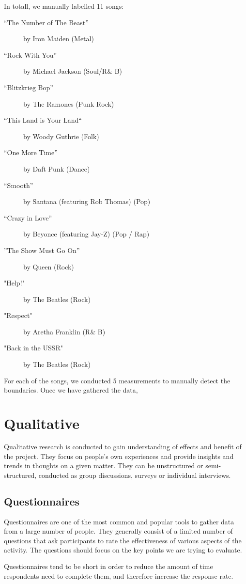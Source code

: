 In totall, we manually labelled 11 songs:
\begin{description}
\item[“The Number of The Beast”] by Iron Maiden (Metal)
\item[“Rock With You”] by Michael Jackson (Soul/R\& B)
\item[“Blitzkrieg Bop”] by The Ramones (Punk Rock)
\item[“This Land is Your Land“] by Woody Guthrie (Folk)
\item[“One More Time”] by Daft Punk (Dance)
\item[“Smooth”] by Santana (featuring Rob Thomas) (Pop)
\item[ “Crazy in Love”] by Beyonce (featuring Jay-Z) (Pop / Rap)
\item[ ”The Show Must Go On”] by Queen (Rock)
\item["Help!"] by The Beatles (Rock)
\item["Respect"] by Aretha Franklin (R\& B)
\item["Back in the USSR"] by The Beatles (Rock)
\end{description}

For each of the songs, we conducted 5 measurements to manually detect the boundaries. Once we have gathered the data,



\section{Qualitative}
Qualitative research is conducted to gain understanding of effects and benefit of the project. They focus on people's own experiences and provide insights and trends in thoughts on a given matter. They can be unstructured or semi-structured, conducted as group discussions, surveys or individual interviews.



\subsection{Questionnaires}
Questionnaires are one of the most common and popular tools to gather data from a large number of people. They generally consist of a limited number of questions that ask participants to rate the effectiveness of various aspects of the activity. The questions should focus on the key points we are trying to evaluate. 

Questionnaires tend to be short in order to reduce the amount of time respondents need to complete them, and therefore increase the response rate. 

